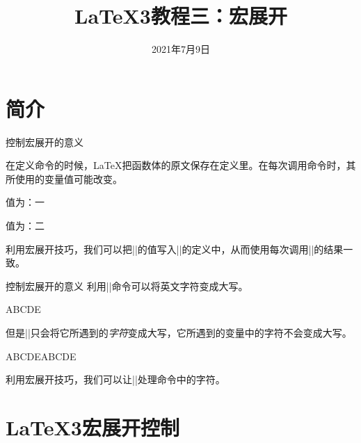 \documentclass[aspectratio=169]{beamer}
\title{\LaTeX3教程三：宏展开}
\date{2021年7月9日}
\begin{document}
\maketitle

\section{简介}

\begin{frame}[fragile]{控制宏展开的意义}

在定义命令的时候，\LaTeX 把函数体的原文保存在定义里。在每次调用命令时，其所使用的变量值可能改变。

\begin{texcode**}
\newcommand{\myvar}{一}
\newcommand{\mycmd}{%
    值为：\myvar%
}
\par\mycmd
\renewcommand{\myvar}{二}
\par\mycmd
\end{texcode**}

利用宏展开技巧，我们可以把\texinl|\myvar|的值写入\texinl|\mycmd|的定义中，从而使用每次调用\texinl|\mycmd|的结果一致。


\end{frame}

\begin{frame}[fragile]{控制宏展开的意义}
利用\texinl|\uppercase|命令可以将英文字符变成大写。
\begin{texcode**}
\uppercase{abcde}
\end{texcode**}
但是\texinl|\uppercase|只会将它所遇到的\emph{字符}变成大写，它所遇到的变量中的字符不会变成大写。
\begin{texcode**}
\newcommand{\myvar}{abcde}
\uppercase{abcde\myvar}
\end{texcode**}
利用宏展开技巧，我们可以让\texinl|\uppercase|处理命令中的字符。
\end{frame}

\section{\LaTeX 3宏展开控制}
\end{document}
